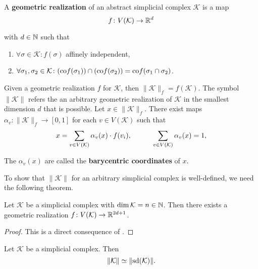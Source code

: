 \begin{defin}
  A \textbf{geometric realization} of an abstract simplicial complex $\mathcal{K}$ is a map
  \begin{equation*}
    f\colon V(\mathcal{K}) \to \mathbb{R}^d
  \end{equation*}

  with $d \in \mathbb{N}$ such that
  \begin{enumerate}
    \item $\forall \sigma \in \mathcal{K}\colon f(\sigma)$ affinely independent,
    \item $\forall \sigma_1, \sigma_2\in \mathcal{K}\colon ({\rm co}f(\sigma_1)) \cap ({\rm co} f(\sigma_2)) = {\rm co}f(\sigma_1 \cap \sigma_2)$.
  \end{enumerate}
    Given a geometric realization $f$ for $\mathcal{K}$, then $\lVert \mathcal{K} \rVert_f = f(\mathcal{K})$. The symbol $\lVert \mathcal{K} \rVert$ refers the an arbitrary geometric realization of $\mathcal{K}$ in the smallest dimension $d$ that is possible.
    Let $x \in \lVert \mathcal{K} \rVert_f$. There exist maps $\alpha_v\colon \lVert \mathcal{K} \rVert_f \to [0, 1]$ for each $v \in V(\mathcal{K})$ such that \begin{equation*}
      x = \sum\limits_{v \in V(\mathcal{K})} \alpha_v(x) \cdot f(v_i), \hspace*{30px} \sum\limits_{v \in V(\mathcal{K})} \alpha_v(x) = 1, 
    \end{equation*}

    The $\alpha_v(x)$ are called the \textbf{barycentric coordinates} of $x$.
\end{defin} 

To show that $\lVert \mathcal{K} \rVert$ for an arbitrary simplicial complex is well-defined, we need the following theorem.

\begin{thm}
  Let $\mathcal{K}$ be a simplicial complex with $\dim \mathcal{K} = n \in \mathbb{N}$. Then there exists a geometric realization $f\colon V(\mathcal{K}) \to \mathbb{R}^{2d+1}$.
\end{thm}

\begin{proof}
  This is a direct consequence of \cite[Lemma 5.1.1]{using2003}.
\end{proof}

\begin{lemma}\label{lem:sdsimeq}
  Let $\mathcal{K}$ be a simplicial complex. Then \[\lVert \mathcal{K} \rVert \simeq \lVert {\rm sd}(\mathcal{K}) \rVert.\]
\end{lemma}

